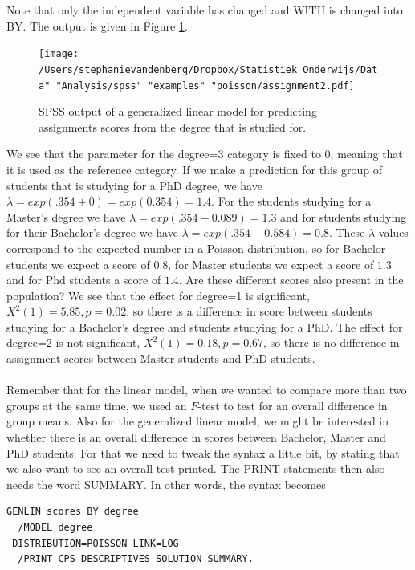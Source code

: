 \documentclass[]{book}\usepackage[]{graphicx}\usepackage[]{color}
\begin{document}
Note that only the independent variable has changed and WITH is changed into BY. The output is given in Figure \ref{fig:assignment2}.


\begin{figure}[h]
    \begin{center}
       \texttt{[image: /Users/stephanievandenberg/Dropbox/Statistiek\_Onderwijs/Data" "Analysis/spss" "examples" "poisson/assignment2.pdf]}
    \end{center}
     \caption{SPSS output of a generalized linear model for predicting assignments scores from the degree that is studied for.}
    \label{fig:assignment2}
\end{figure}


We see that the parameter for the degree=3 category is fixed to 0, meaning that it is used as the reference category. If we make a prediction for this group of students that is studying for a PhD degree, we have $\lambda = exp(.354 + 0) = exp(0.354)=1.4$. For the students studying for a Master's degree we have $\lambda = exp(.354 - 0.089) =1.3$ and for students studying for their Bachelor's degree we have $\lambda = exp(.354 - 0.584) =0.8$. These $\lambda$-values correspond to the expected number in a Poisson distribution, so for Bachelor students we expect a score of $0.8$, for Master students we expect a score of $1.3$ and for Phd students a score of $1.4$. Are these different scores also present in the population? We see that the effect for degree=1 is significant, $X^2(1)=5.85, p=0.02$, so there is a difference in score between students studying for a Bachelor's degree and students studying for a PhD. The effect for degree=2 is not significant, $X^2(1)=0.18, p=0.67$, so there is no difference in assignment scores between Master students and PhD students.
\\
\\
Remember that for the linear model, when we wanted to compare more than two groups at the same time, we used an $F$-test to test for an overall difference in group means. Also for the generalized linear model, we might be interested in whether there is an overall difference in scores between Bachelor, Master and PhD students. For that we need to tweak the syntax a little bit, by stating that we also want to see an overall test printed. The PRINT statements then also needs the word SUMMARY. In other words, the syntax becomes

\begin{verbatim}
GENLIN scores BY degree
  /MODEL degree
 DISTRIBUTION=POISSON LINK=LOG
  /PRINT CPS DESCRIPTIVES SOLUTION SUMMARY.
\end{verbatim}
\end{document}
